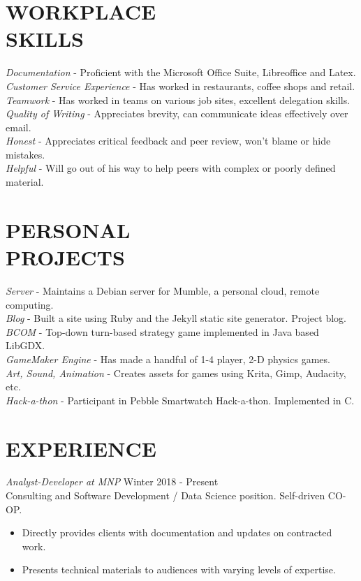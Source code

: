 \documentclass[margin]{res}
\begin{document}
\begin{resume}
\section{WORKPLACE \\ SKILLS} 
 {\sl Documentation} - Proficient with the Microsoft Office Suite, Libreoffice and Latex.\\
{\sl Customer Service Experience} - Has worked in restaurants, coffee shops and retail.\\
{\sl Teamwork} - Has worked in teams on various job sites, excellent delegation skills.\\
{\sl Quality of Writing} - Appreciates brevity, can communicate ideas effectively over email.\\
{\sl Honest} - Appreciates critical feedback and peer review, won't blame or hide mistakes.\\
{\sl Helpful} - Will go out of his way to help peers with complex or poorly defined material.



\section{PERSONAL \\ PROJECTS}     
	{\sl Server} - Maintains a Debian server for Mumble, a personal cloud, remote computing.\\   
	{\sl Blog} - Built a site using Ruby and the Jekyll static site generator. Project blog.\\   
	{\sl BCOM} - Top-down turn-based strategy game implemented in Java based LibGDX.\\
	{\sl GameMaker Engine} - Has made a handful of 1-4 player, 2-D physics games.\\
	{\sl Art, Sound, Animation} - Creates assets for games using Krita, Gimp, Audacity, etc.\\
	{\sl Hack-a-thon} - Participant in Pebble Smartwatch Hack-a-thon. Implemented in C.
 




\section{EXPERIENCE} {\sl Analyst-Developer at MNP} \hfill Winter 2018 - Present\\
                Consulting and Software Development / Data Science position. Self-driven CO-OP.
                 \begin{itemize}  \itemsep -2pt %
                 \item Directly provides clients with documentation and updates on contracted work.
                \item  Presents technical materials to audiences with varying levels of expertise.
                \end{itemize}
                

\end{resume}
\end{document}
